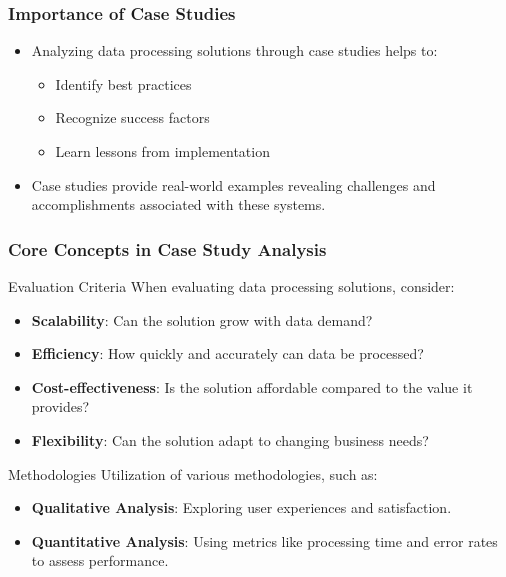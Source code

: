 \documentclass[aspectratio=169]{beamer}
\begin{document}
\begin{frame}[fragile]
    \frametitle{Importance of Case Studies}
    \begin{itemize}
        \item Analyzing data processing solutions through case studies helps to:
        \begin{itemize}
            \item Identify best practices
            \item Recognize success factors
            \item Learn lessons from implementation
        \end{itemize}
        \item Case studies provide real-world examples revealing challenges and accomplishments associated with these systems.
    \end{itemize}
\end{frame}

\begin{frame}[fragile]
    \frametitle{Core Concepts in Case Study Analysis}
    \begin{block}{Evaluation Criteria}
        When evaluating data processing solutions, consider:
        \begin{itemize}
            \item \textbf{Scalability}: Can the solution grow with data demand?
            \item \textbf{Efficiency}: How quickly and accurately can data be processed?
            \item \textbf{Cost-effectiveness}: Is the solution affordable compared to the value it provides?
            \item \textbf{Flexibility}: Can the solution adapt to changing business needs?
        \end{itemize}
    \end{block}
    
    \begin{block}{Methodologies}
        Utilization of various methodologies, such as:
        \begin{itemize}
            \item \textbf{Qualitative Analysis}: Exploring user experiences and satisfaction.
            \item \textbf{Quantitative Analysis}: Using metrics like processing time and error rates to assess performance.
        \end{itemize}
    \end{block}
\end{frame}
\end{document}
